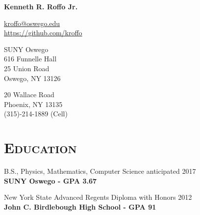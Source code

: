\documentclass[8pt]{article}
\def\name{Kenneth R. Roffo Jr.}
\renewenvironment{itemize}{
  \begin{list}{}{
    \setlength{\leftmargin}{1.5em}
  }
}{
  \end{list}
}
\begin{document}
{\huge \bf \name}


\large \href{mailto:kroffo@oswego.edu}{kroffo@oswego.edu}\\
\href{https://github.com/kroffo}{https://github.com/kroffo}\\

\vspace{0.15in}

\begin{minipage}{0.45\linewidth}
  SUNY Oswego \\
  616 Funnelle Hall\\
  25 Union Road\\
  Oswego, NY 13126 \\
\end{minipage}
\begin{minipage}{0.45\linewidth}
20 Wallace Road \\
Phoenix, NY 13135 \\
(315)-214-1889 (Cell)

\end{minipage}

\section*{\textsc{Education}}

\begin{itemize}
  \item B.S., Physics, Mathematics, Computer Science \hfill anticipated 2017\\
  \textbf{SUNY Oswego - GPA 3.67}
  \item New York State Advanced Regents Diploma with Honors \hfill 2012\\
  \textbf{John C. Birdlebough High School - GPA 91}
  \end{itemize}	
\end{document}
